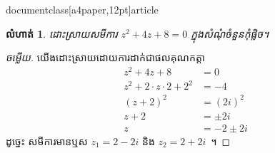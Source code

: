 documentclass[a4paper,12pt]{article}
\usepackage[no-math]{fontspec}
\setmainfont{Khmer OS}
\usepackage{tcolorbox}
\usepackage{amsmath}
\usepackage{amssymb}
\usepackage{amsthm}
\newtheorem*{exc*}{លំហាត់}

\begin{exc*}
ដោះស្រាយសមីការ $ z^2+4z+8=0 $ ក្នុងសំណុំចំនួនកុំផ្លិច។
\end{exc*}
\begin{proof}[ចម្លើយ]
យើងដោះស្រាយដោយការដាក់ជាផលគុណកត្តា
\begin{align*}
z^2+4z+8 &=0\\
z^2+2\cdot z\cdot 2+2^2 &=-4\\
(z+2)^2 &=(2i)^2\\
z+2 &=\pm 2i\\
z &=-2\pm 2i
\end{align*}
ដូច្នេះ សមីការមានឬស $ z_1=2-2i $ និង $ z_2=2+2i $~។
\end{proof}


